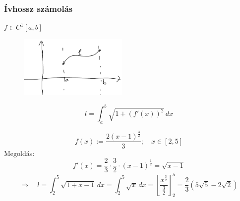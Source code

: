 \documentclass[a4paper,11.5pt]{article}
\begin{document}
	\subsubsection{Ívhossz számolás}
	\begin{note}
		$f\in C^1[a,b]$
		\begin{figure}[H]
			\centering
			\includegraphics[height=3cm]{../2zh/kepek/11.png}
			\caption{}
		\end{figure}
		\vspace{-6mm}
		\[ l=\int_a^b\sqrt{1+(f'(x))^2}\,dx \]
	\end{note}
	\begin{example}
		\[ f(x):=\frac{2(x-1)^{\frac{3}{2}}}{3};\quad x\in[2,5] \]
		Megoldás:
		\[ f'(x)=\frac{2}{3}\cdot\frac{3}{2}\cdot(x-1)^\frac{1}{2}=\sqrt{x-1} \]
		\[ \Rightarrow\quad l=\int_2^5\sqrt{1+x-1}\,dx=\int_2^5\sqrt{x}\,dx=\left[\frac{x^\frac{3}{2}}{\frac{3}{2}}\right]_2^5=\frac{2}{3}\left(5\sqrt{5}-2\sqrt{2}\right) \]
	\end{example}
\end{document}
